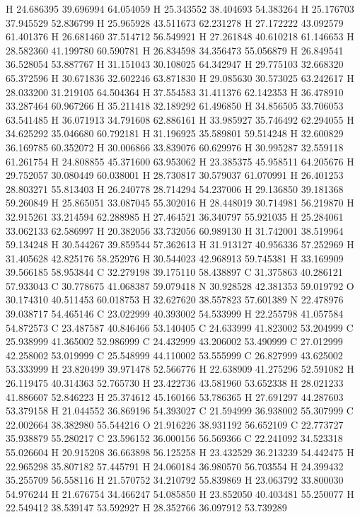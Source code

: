 \documentclass{article}
\begin{document}
H 24.686395 39.696994 64.054059
H 25.343552 38.404693 54.383264
H 25.176703 37.945529 52.836799
H 25.965928 43.511673 62.231278
H 27.172222 43.092579 61.401376
H 26.681460 37.514712 56.549921
H 27.261848 40.610218 61.146653
H 28.582360 41.199780 60.590781
H 26.834598 34.356473 55.056879
H 26.849541 36.528054 53.887767
H 31.151043 30.108025 64.342947
H 29.775103 32.668320 65.372596
H 30.671836 32.602246 63.871830
H 29.085630 30.573025 63.242617
H 28.033200 31.219105 64.504364
H 37.554583 31.411376 62.142353
H 36.478910 33.287464 60.967266
H 35.211418 32.189292 61.496850
H 34.856505 33.706053 63.541485
H 36.071913 34.791608 62.886161
H 33.985927 35.746492 62.294055
H 34.625292 35.046680 60.792181
H 31.196925 35.589801 59.514248
H 32.600829 36.169785 60.352072
H 30.006866 33.839076 60.629976
H 30.995287 32.559118 61.261754
H 24.808855 45.371600 63.953062
H 23.385375 45.958511 64.205676
H 29.752057 30.080449 60.038001
H 28.730817 30.579037 61.070991
H 26.401253 28.803271 55.813403
H 26.240778 28.714294 54.237006
H 29.136850 39.181368 59.260849
H 25.865051 33.087045 55.302016
H 28.448019 30.714981 56.219870
H 32.915261 33.214594 62.288985
H 27.464521 36.340797 55.921035
H 25.284061 33.062133 62.586997
H 20.382056 33.732056 60.989130
H 31.742001 38.519964 59.134248
H 30.544267 39.859544 57.362613
H 31.913127 40.956336 57.252969
H 31.405628 42.825176 58.252976
H 30.544023 42.968913 59.745381
H 33.169909 39.566185 58.953844
C 32.279198 39.175110 58.438897
C 31.375863 40.286121 57.933043
C 30.778675 41.068387 59.079418
N 30.928528 42.381353 59.019792
O 30.174310 40.511453 60.018753
H 32.627620 38.557823 57.601389
N 22.478976 39.038717 54.465146
C 23.022999 40.393002 54.533999
H 22.255798 41.057584 54.872573
C 23.487587 40.846466 53.140405
C 24.633999 41.823002 53.204999
C 25.938999 41.365002 52.986999
C 24.432999 43.206002 53.490999
C 27.012999 42.258002 53.019999
C 25.548999 44.110002 53.555999
C 26.827999 43.625002 53.333999
H 23.820499 39.971478 52.566776
H 22.638909 41.275296 52.591082
H 26.119475 40.314363 52.765730
H 23.422736 43.581960 53.652338
H 28.021233 41.886607 52.846223
H 25.374612 45.160166 53.786365
H 27.691297 44.287603 53.379158
H 21.044552 36.869196 54.393027
C 21.594999 36.938002 55.307999
C 22.002664 38.382980 55.544216
O 21.916226 38.931192 56.652109
C 22.773727 35.938879 55.280217
C 23.596152 36.000156 56.569366
C 22.241092 34.523318 55.026604
H 20.915208 36.663898 56.125258
H 23.432529 36.213239 54.442475
H 22.965298 35.807182 57.445791
H 24.060184 36.980570 56.703554
H 24.399432 35.255709 56.558116
H 21.570752 34.210792 55.839869
H 23.063792 33.800030 54.976244
H 21.676754 34.466247 54.085850
H 23.852050 40.403481 55.250077
H 22.549412 38.539147 53.592927
H 28.352766 36.097912 53.739289
~    
   
\end{document}
